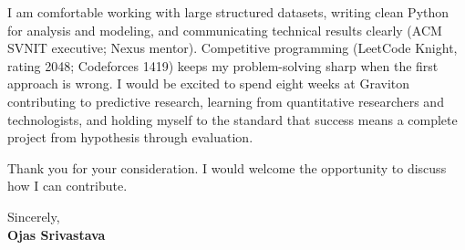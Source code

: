 \documentclass[a4paper,11pt]{article}
\begin{document}
I am comfortable working with large structured datasets, writing clean Python for analysis and modeling, and communicating technical results clearly (ACM SVNIT executive; Nexus mentor). Competitive programming (LeetCode Knight, rating 2048; Codeforces 1419) keeps my problem-solving sharp when the first approach is wrong. I would be excited to spend eight weeks at Graviton contributing to predictive research, learning from quantitative researchers and technologists, and holding myself to the standard that success means a complete project from hypothesis through evaluation.

Thank you for your consideration. I would welcome the opportunity to discuss how I can contribute.

Sincerely, \\
\vspace{8mm}
\textbf{Ojas Srivastava}
\end{document}
